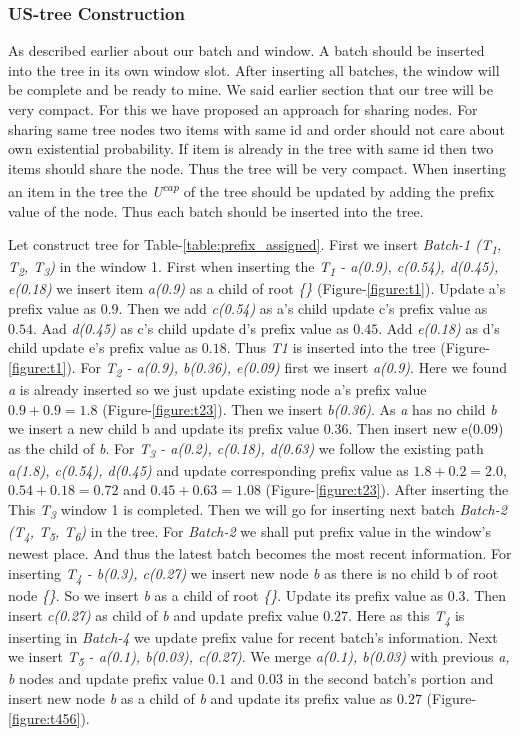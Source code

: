 \documentclass[conference]{IEEEtran}
\begin{document}
\subsubsection{US-tree Construction}

As described earlier about our batch and window. A batch should be inserted into the tree in its own window slot. After inserting all batches, the window will be complete and be ready to mine. We said earlier section that our tree will be very compact. For this we have proposed an approach for sharing nodes. For sharing same tree nodes two items with same id and order should not care about own existential probability. If item is already in the tree with same id then two items should share the node. Thus the tree will be very compact. When inserting an item in the tree the \emph{U\textsuperscript{cap}} of the tree should be updated by adding the prefix value of the node. Thus each batch should be inserted into the tree.
    
    Let construct tree for Table-\ref{table:prefix_assigned}. First we insert \emph{Batch-1 (T\textsubscript{1}, T\textsubscript{2}, T\textsubscript{3})} in the window 1. First when inserting the \emph{T\textsubscript{1} - a(0.9), c(0.54), d(0.45), e(0.18)} we insert item \emph{a(0.9)} as a child of root \emph{\{\}} (Figure-\ref{figure:t1}). Update a's prefix value as $0.9$. Then we add \emph{c(0.54)} as a's child update c's prefix value as $0.54$. Aad \emph{d(0.45)} as c's child update d's prefix value as $0.45$. Add \emph{e(0.18)} as d's child update e's prefix value as $0.18$. Thus \emph{T1} is inserted into the tree (Figure-\ref{figure:t1}). For \emph{T\textsubscript{2} - a(0.9), b(0.36), e(0.09)} first we insert \emph{a(0.9)}. Here we found \emph{a} is already inserted so we just update existing node a's prefix value $0.9 + 0.9 = 1.8$ (Figure-\ref{figure:t23}). Then we insert \emph{b(0.36)}. As \emph{a} has no child \emph{b} we insert a new child b and update its prefix value $0.36$. Then insert new e(0.09) as the child of \emph{b}. For \emph{T\textsubscript{3} - a(0.2), c(0.18), d(0.63)} we follow the existing path \emph{a(1.8), c(0.54), d(0.45)} and update corresponding prefix value as $1.8 + 0.2 = 2.0$, $0.54 + 0.18 = 0.72$ and $0.45 + 0.63 = 1.08$ (Figure-\ref{figure:t23}). After inserting the This \emph{T\textsubscript{3}} window 1 is completed. Then we will go for inserting next batch \emph{Batch-2 (T\textsubscript{4}, T\textsubscript{5}, T\textsubscript{6})} in the tree. For \emph{Batch-2} we shall put prefix value in the window's newest place. And thus the latest batch becomes the most recent information. For inserting \emph{T\textsubscript{4} - b(0.3), c(0.27)} we insert new node \emph{b} as there is no child b of root node \emph{\{\}}. So we insert \emph{b} as a child of root \emph{\{\}}. Update its prefix value as $0.3$. Then insert \emph{c(0.27)} as child of \emph{b} and update prefix value $0.27$. Here as this \emph{T\textsubscript{4}} is inserting in \emph{Batch-4} we update prefix value for recent batch's information. Next we insert \emph{T\textsubscript{5} - a(0.1), b(0.03), c(0.27)}. We merge \emph{a(0.1), b(0.03)} with previous \emph{a, b } nodes and update prefix value $0.1$ and $0.03$ in the second batch's portion and insert new node \emph{b} as a child of \emph{b} and update its prefix value as $0.27$ (Figure-\ref{figure:t456}).
\end{document}
